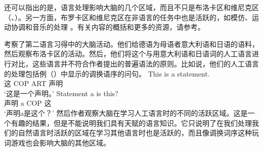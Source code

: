 还可以指出的是，语言处理影响大脑的几个区域，而且不只是布洛卡区和维尼克区（\citealp[]{FM2005a}、\citealp{Friederici2009a}）。另一方面，布罗卡区和维尼克区在非语言的任务中也是活跃的，如模仿、运动协调和音乐的处理 \citep{MKGF2001a}。有关内容的概括和更多的资源，请参考。

\citet{MMGRRBW2003a}考察了第二语言习得中的大脑活动。他们给德语为母语者意大利语和日语的语料，然后观察布洛卡区的活动。然后，他们将这个与用意大利语和日语词的人工语言进行对比，这些语言并不符合作者提出的普遍语法的原则。比如说，他们的人工语言的处理包括例（）中显示的调换语序的问句。
\eal
\ex 
\gll This is a statement.\\
这 COP ART 声明\\
\glt `这是一个声明。'
\ex 
\gll Statement a is this?\\
声明 a COP 这\\
\glt `声明a是这个？'
\zl
然后作者观察大脑在学习人工语言时的不同的活跃区域。这是一个有趣的结果，但是不能说明我们具有天赋的语言知识。它只说明了在我们处理我们的自然语言时活跃的区域在学习其他语言时也是活跃的，而且像调换词序这种玩词游戏也会影响大脑的其他区域。

